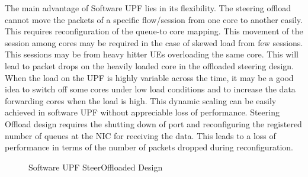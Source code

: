 The main advantage of Software UPF lies in its flexibility. The steering offload cannot move the packets of a specific flow/session from one core to another easily. This requires reconfiguration of the queue-to core mapping.
This movement of the session among cores may be required in the case of skewed load from few sessions. This sessions may be from heavy hitter UEs overloading the same core. This will lead to packet drops on the heavily loaded core in the offloaded steering design.
When the load on the UPF is highly variable across the time, it may be a good idea to switch off some cores under low load conditions and to increase the data
forwarding cores when the load is high. This dynamic scaling can be easily
achieved in software UPF without appreciable loss of performance. Steering Offload design requires the shutting down of port and reconfiguring the registered number of queues at the NIC for receiving the data. This leads to a loss of performance in terms of the number of packets dropped during reconfiguration.
\begin{figure}[htbp]
    \centering
    
    \caption{ Software UPF   SteerOffloaded Design}
        \label{figure:DesignAB}
    \end{figure}

